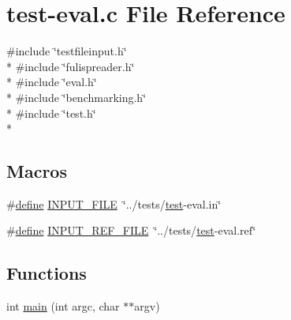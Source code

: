 \hypertarget{test-eval_8c}{\section{test-\/eval.c File Reference}
\label{test-eval_8c}
}
{\ttfamily \#include \char`\"{}testfileinput.\+h\char`\"{}}\\*
{\ttfamily \#include \char`\"{}fulispreader.\+h\char`\"{}}\\*
{\ttfamily \#include \char`\"{}eval.\+h\char`\"{}}\\*
{\ttfamily \#include \char`\"{}benchmarking.\+h\char`\"{}}\\*
{\ttfamily \#include \char`\"{}test.\+h\char`\"{}}\\*
\subsection*{Macros}
\begin{DoxyCompactItemize}
\item 
\#\hyperlink{nativefunctions_8h_a06f28a72fd48e4a07d1d9e541bad304a}{define} \hyperlink{test-eval_8c_a2a3ad4ebb43e29f804a1e524aca840b2}{I\+N\+P\+U\+T\+\_\+\+F\+I\+L\+E}~\char`\"{}../tests/\hyperlink{test_8h_a3579ec9342b5c608ec759101a87e75cf}{test}-\/eval.\+in\char`\"{}
\item 
\#\hyperlink{nativefunctions_8h_a06f28a72fd48e4a07d1d9e541bad304a}{define} \hyperlink{test-eval_8c_a43e9fc259556970183f22f223a403250}{I\+N\+P\+U\+T\+\_\+\+R\+E\+F\+\_\+\+F\+I\+L\+E}~\char`\"{}../tests/\hyperlink{test_8h_a3579ec9342b5c608ec759101a87e75cf}{test}-\/eval.\+ref\char`\"{}
\end{DoxyCompactItemize}
\subsection*{Functions}
\begin{DoxyCompactItemize}
\item 
int \hyperlink{test-eval_8c_a3c04138a5bfe5d72780bb7e82a18e627}{main} (int argc, char $\ast$$\ast$argv)
\end{DoxyCompactItemize}


